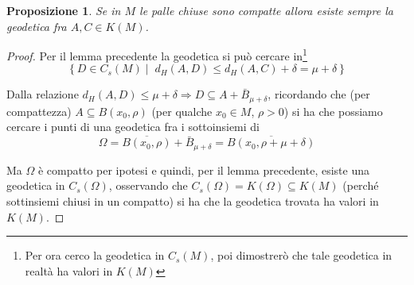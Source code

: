 \documentclass[a4paper,10pt]{article}
\newcounter{counter1}
\theoremstyle{plain}
\newtheorem{mypro}[counter1]{Proposizione}
\theoremstyle{definition}
\theoremstyle{remark}
\newcommand{\obar}[1]{\overline{#1}}
\newcommand{\set}[1]{\left\{#1\right\}}
\begin{document}
\begin{mypro}
  Se in $M$ le palle chiuse sono compatte allora esiste sempre la
  geodetica fra $A,C \in K(M)$.
\end{mypro}
\begin{proof}
  Per il lemma precedente la geodetica si può cercare in\footnote{Per
    ora cerco la geodetica in $C_s(M)$, poi dimostrerò che tale
    geodetica in realtà ha valori in $K(M)$}
  \[ \set{D \in C_s(M) \mid \; d_H(A,D) \le d_H(A,C) + \delta= \mu +
    \delta } \]

  Dalla relazione $d_H(A,D) \le \mu + \delta \Rightarrow D \subseteq A
  + \bar B _{\mu + \delta}$, ricordando che (per compattezza) $A \subseteq
  B(x_0,\rho)$ (per qualche $x_0 \in M$, $\rho >0$) si ha che possiamo
  cercare i punti di una geodetica fra i sottoinsiemi di
  \[ \Omega = \obar{B(x_0,\rho)} + \bar B _{\mu + \delta} = \obar{ B
    (x_0, \rho + \mu + \delta) } \]

  Ma $\Omega$ è compatto per ipotesi e quindi, per il lemma
  precedente, esiste una geodetica in $C_s(\Omega)$, osservando che
  $C_s(\Omega) = K(\Omega) \subseteq K(M)$ (perché sottinsiemi chiusi
  in un compatto) si ha che la geodetica trovata ha valori in $K(M)$.
\end{proof}
\end{document}
